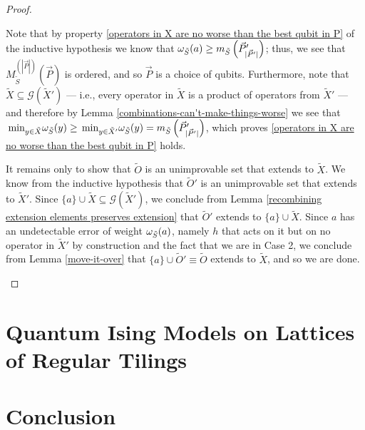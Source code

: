 \documentclass[twocolumn,showpacs,preprintnumbers,amsmath,amssymb,nofootinbib,pra,floatfix]{revtex4-1}
\newcommand{\lst}{\vec}
\newcommand{\set}{\tilde}
\newcommand{\genfun}{\mathcal{G}}
\begin{document}
\begin{proof}
\begin{description}
Note that by property \ref{operators in X are no worse than the best qubit in P} of the inductive hypothesis we know that $\om_{\set S}(a)\ge m_{\set S}\paren{\lst P'_{|\lst P'|}}$;  thus, we see that $M^{(|\lst P|)}_{\set S}(\lst P)$ is ordered, and so $\lst P$ is a choice of qubits.  Furthermore, note that $\set X\subseteq \genfun(\set X')$ --- i.e., every operator in $\set X$ is a product of operators from $\set X'$ --- and therefore by Lemma \ref{combinations-can't-make-things-worse} we see that $\min_{y\in\set X}\om_{\set S}(y)\ge \min_{y\in\set X'}\om_{\set S}(y)=m_{\set S}\paren{\lst P'_{|\lst P'|}}$, which proves \ref{operators in X are no worse than the best qubit in P} holds.

It remains only to show that $\set O$ is an unimprovable set that extends to $\set X$.  We know from the inductive hypothesis that $\set O'$ is an unimprovable set that extends to $\set X'$.  Since $\{a\}\cup\set X\subseteq \genfun(\set X')$, we conclude from Lemma \ref{recombining extension elements preserves extension} that $\set O'$ extends to $\{a\}\cup\set X$.  Since $a$ has an undetectable error of weight $\om_{\set S}(a)$, namely $h$ that acts on it but on no operator in $\set X'$ by construction and the fact that we are in Case 2, we conclude from Lemma \ref{move-it-over} that $\{a\}\cup \set O'\equiv \set O$ extends to $\set X$, and so we are done.
\end{description}

\end{proof}

\section{Quantum Ising Models on Lattices of Regular Tilings} \label{sec:lattice}

\section{Conclusion}


\end{document}
